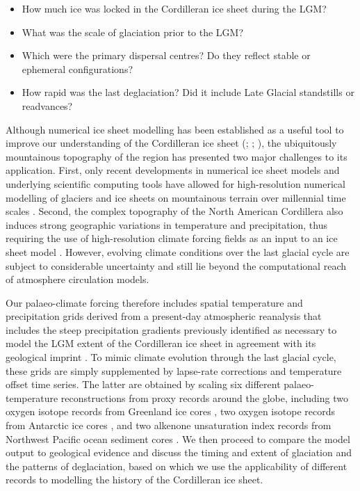 \documentclass[tc, manuscript]{copernicus}
\begin{document}
\begin{itemize}
  \item How much ice was locked in the Cordilleran ice sheet during the LGM?
  \item What was the scale of glaciation prior to the LGM?
  \item Which were the primary dispersal centres? Do they reflect stable or
    ephemeral configurations?
  \item How rapid was the last deglaciation? Did it include Late Glacial
    standstills or readvances?
\end{itemize}

Although numerical ice sheet modelling has been established as a useful tool to
improve our understanding of the Cordilleran ice sheet
    (\citealp[p.~227]{Jackson.Clague.1991}; \citealp{Robert.1991};
     \citealp{Marshall.etal.2000}),
the ubiquitously mountainous
topography of the region has presented two major challenges to its application.
First, only recent developments in numerical ice sheet models and underlying
scientific computing tools \citep{Bueler.Brown.2009, Balay.etal.2015} have
allowed for high-resolution numerical modelling of glaciers and ice sheets on
mountainous terrain
over millennial time scales \citep[e.g.,][]{Golledge.etal.2012}. Second, the
complex topography of the North American Cordillera also induces strong
geographic variations in temperature and precipitation, thus requiring the use
of high-resolution climate forcing fields as an input to an ice sheet model
\citep{Seguinot.etal.2014}. However, evolving climate conditions over the last
glacial cycle are subject to considerable uncertainty and still lie beyond the
computational reach of atmosphere circulation models.

Our palaeo-climate forcing therefore includes spatial temperature and
precipitation grids derived from a present-day atmospheric reanalysis
\citep{Mesinger.etal.2006} that includes the steep precipitation gradients
previously identified as necessary to model the LGM extent of the Cordilleran
ice sheet in agreement with its geological imprint
\citep{Seguinot.etal.2014}. To mimic climate evolution through the last glacial
cycle, these grids are simply supplemented by lapse-rate corrections
and temperature offset time series. The latter are obtained by scaling six
different palaeo-temperature reconstructions from proxy records around the
globe, including two oxygen isotope records from Greenland ice cores
\citep{Dansgaard.etal.1993, Andersen.etal.2004}, two oxygen isotope
records from Antarctic ice cores \citep{Petit.etal.1999,Jouzel.etal.2007},
and two alkenone unsaturation index records from Northwest Pacific ocean
sediment cores \citep{Herbert.etal.2001}. We then proceed to compare the model
output to geological evidence and discuss the timing and extent of glaciation
and the patterns of deglaciation, based on which we use the applicability of
different records to modelling the history of the Cordilleran ice sheet.
\end{document}
